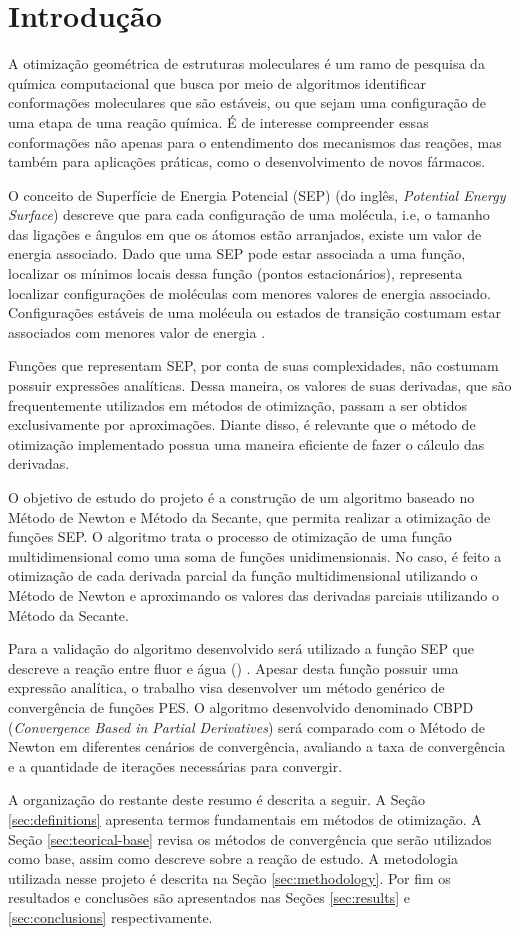 \section{Introdução}

A otimização geométrica de estruturas moleculares é um ramo de pesquisa da química
computacional que busca por meio de algoritmos identificar conformações moleculares que
são estáveis, ou que sejam uma configuração de uma etapa de uma reação química. É de interesse compreender essas conformações não apenas para o entendimento dos mecanismos das reações, mas também para aplicações práticas, como o desenvolvimento de novos fármacos.

O conceito de Superfície de Energia Potencial (SEP) (do inglês, \textit{Potential Energy Surface}) descreve que para cada configuração de uma molécula, i.e, o tamanho das ligações e ângulos em que os átomos estão arranjados, existe um valor de energia associado. Dado que uma SEP pode estar associada a uma função, localizar os mínimos locais dessa função (pontos estacionários), representa localizar configurações de moléculas com menores valores de energia associado. Configurações estáveis de uma molécula ou estados de transição costumam estar associados com menores valor de energia \cite{geometry_optimization}.

Funções que representam SEP, por conta de suas complexidades, não costumam possuir expressões analíticas. Dessa maneira, os valores de suas derivadas, que são frequentemente utilizados em métodos de otimização, passam a ser obtidos  exclusivamente por aproximações. Diante disso, é relevante que o método de otimização implementado possua uma maneira eficiente de fazer o cálculo das derivadas. 

O objetivo de estudo do projeto é a construção de um algoritmo baseado no Método de Newton e Método da Secante, que permita realizar a otimização de funções SEP. O algoritmo trata o processo de otimização de uma função multidimensional como uma soma de funções unidimensionais. No caso, é feito a otimização de cada derivada parcial da função multidimensional utilizando o Método de Newton e aproximando os valores das derivadas parciais utilizando o Método da Secante.

Para a validação do algoritmo desenvolvido será utilizado a função SEP que descreve a reação entre fluor e água () \cite{fh2o_first_sep}. Apesar desta funçã̀o possuir uma expressão analítica, o trabalho visa desenvolver um método genérico de convergência de funções PES. O algoritmo desenvolvido denominado CBPD (\textit{Convergence Based in Partial Derivatives}) será comparado com o Método de Newton em diferentes cenários de convergência, avaliando a taxa de convergência e a quantidade de iterações necessárias para convergir.

A organização do restante deste resumo é descrita a seguir. A Seção \ref{sec:definitions} apresenta termos fundamentais em métodos de otimização. A Seção \ref{sec:teorical-base} revisa os métodos de convergência que serão utilizados como base, assim como descreve sobre a reação de estudo. A metodologia utilizada nesse projeto é descrita na Seção \ref{sec:methodology}. Por fim os resultados e conclusões são apresentados nas Seções \ref{sec:results} e \ref{sec:conclusions} respectivamente.
